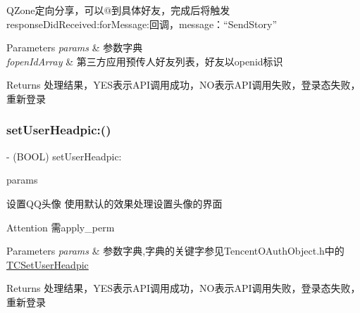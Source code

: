 Q\+Zone定向分享，可以@到具体好友，完成后将触发response\+Did\+Received\+:for\+Message\+:回调，message：“\+Send\+Story” 
\begin{DoxyParams}{Parameters}
{\em params} & 参数字典 \\
\hline
{\em fopen\+Id\+Array} & 第三方应用预传人好友列表，好友以openid标识 \\
\hline
\end{DoxyParams}
\begin{DoxyReturn}{Returns}
处理结果，\+Y\+E\+S表示\+A\+P\+I调用成功，\+N\+O表示\+A\+P\+I调用失败，登录态失败，重新登录 
\end{DoxyReturn}
\mbox{\label{interface_tencent_o_auth_a2efce592b134d225f092451cdfe7fd99}} 
\subsubsection{\texorpdfstring{set\+User\+Headpic\+:()}{setUserHeadpic:()}\hspace{0.1cm}{\footnotesize\ttfamily [1/2]}}
{\footnotesize\ttfamily -\/ (B\+O\+OL) set\+User\+Headpic\+: \begin{DoxyParamCaption}\item[{(N\+S\+Mutable\+Dictionary $\ast$)}]{params }\end{DoxyParamCaption}}

设置\+Q\+Q头像 使用默认的效果处理设置头像的界面 \begin{DoxyAttention}{Attention}
需apply\+\_\+perm 
\end{DoxyAttention}

\begin{DoxyParams}{Parameters}
{\em params} & 参数字典,字典的关键字参见\+Tencent\+O\+Auth\+Object.\+h中的\mbox{\hyperlink{interface_t_c_set_user_headpic}{T\+C\+Set\+User\+Headpic}} \\
\hline
\end{DoxyParams}
\begin{DoxyReturn}{Returns}
处理结果，\+Y\+E\+S表示\+A\+P\+I调用成功，\+N\+O表示\+A\+P\+I调用失败，登录态失败，重新登录 
\end{DoxyReturn}
\mbox{\label{interface_tencent_o_auth_a2efce592b134d225f092451cdfe7fd99}} 
